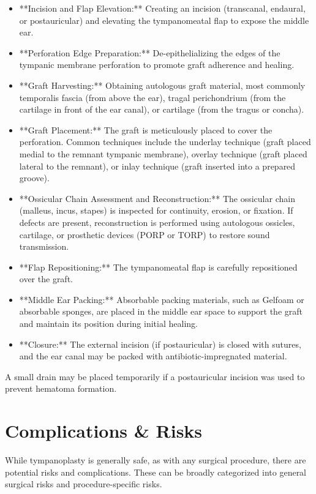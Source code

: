 \begin{itemize}
  \item **Incision and Flap Elevation:** Creating an incision (transcanal, endaural, or postauricular) and elevating the tympanomeatal flap to expose the middle ear.
  \item **Perforation Edge Preparation:** De-epithelializing the edges of the tympanic membrane perforation to promote graft adherence and healing.
  \item **Graft Harvesting:** Obtaining autologous graft material, most commonly temporalis fascia (from above the ear), tragal perichondrium (from the cartilage in front of the ear canal), or cartilage (from the tragus or concha).
  \item **Graft Placement:** The graft is meticulously placed to cover the perforation. Common techniques include the underlay technique (graft placed medial to the remnant tympanic membrane), overlay technique (graft placed lateral to the remnant), or inlay technique (graft inserted into a prepared groove).
  \item **Ossicular Chain Assessment and Reconstruction:** The ossicular chain (malleus, incus, stapes) is inspected for continuity, erosion, or fixation. If defects are present, reconstruction is performed using autologous ossicles, cartilage, or prosthetic devices (PORP or TORP) to restore sound transmission.
  \item **Flap Repositioning:** The tympanomeatal flap is carefully repositioned over the graft.
  \item **Middle Ear Packing:** Absorbable packing materials, such as Gelfoam or absorbable sponges, are placed in the middle ear space to support the graft and maintain its position during initial healing.
  \item **Closure:** The external incision (if postauricular) is closed with sutures, and the ear canal may be packed with antibiotic-impregnated material.
\end{itemize}

A small drain may be placed temporarily if a postauricular incision was used to prevent hematoma formation.

\section*{Complications \& Risks}
While tympanoplasty is generally safe, as with any surgical procedure, there are potential risks and complications. These can be broadly categorized into general surgical risks and procedure-specific risks.

